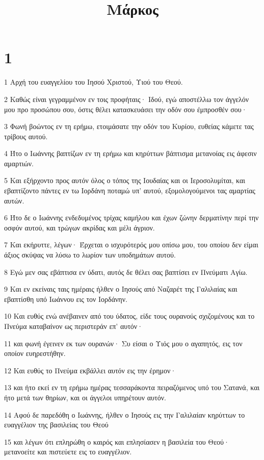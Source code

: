 

\title{Μάρκος}


\chapter{1}

\par 1 Αρχή του ευαγγελίου του Ιησού Χριστού, Υιού του Θεού.
\par 2 Καθώς είναι γεγραμμένον εν τοις προφήταις· Ιδού, εγώ αποστέλλω τον άγγελόν μου προ προσώπου σου, όστις θέλει κατασκευάσει την οδόν σου έμπροσθέν σου·
\par 3 Φωνή βοώντος εν τη ερήμω, ετοιμάσατε την οδόν του Κυρίου, ευθείας κάμετε τας τρίβους αυτού.
\par 4 Ήτο ο Ιωάννης βαπτίζων εν τη ερήμω και κηρύττων βάπτισμα μετανοίας εις άφεσιν αμαρτιών.
\par 5 Και εξήρχοντο προς αυτόν όλος ο τόπος της Ιουδαίας και οι Ιεροσολυμίται, και εβαπτίζοντο πάντες εν τω Ιορδάνη ποταμώ υπ' αυτού, εξομολογούμενοι τας αμαρτίας αυτών.
\par 6 Ήτο δε ο Ιωάννης ενδεδυμένος τρίχας καμήλου και έχων ζώνην δερματίνην περί την οσφύν αυτού, και τρώγων ακρίδας και μέλι άγριον.
\par 7 Και εκήρυττε, λέγων· Έρχεται ο ισχυρότερός μου οπίσω μου, του οποίου δεν είμαι άξιος σκύψας να λύσω το λωρίον των υποδημάτων αυτού.
\par 8 Εγώ μεν σας εβάπτισα εν ύδατι, αυτός δε θέλει σας βαπτίσει εν Πνεύματι Αγίω.
\par 9 Και εν εκείναις ταις ημέραις ήλθεν ο Ιησούς από Ναζαρέτ της Γαλιλαίας και εβαπτίσθη υπό Ιωάννου εις τον Ιορδάνην.
\par 10 Και ευθύς ενώ ανέβαινεν από του ύδατος, είδε τους ουρανούς σχιζομένους και το Πνεύμα καταβαίνον ως περιστεράν επ' αυτόν·
\par 11 και φωνή έγεινεν εκ των ουρανών· Συ είσαι ο Υιός μου ο αγαπητός, εις τον οποίον ευηρεστήθην.
\par 12 Και ευθύς το Πνεύμα εκβάλλει αυτόν εις την έρημον·
\par 13 και ήτο εκεί εν τη ερήμω ημέρας τεσσαράκοντα πειραζόμενος υπό του Σατανά, και ήτο μετά των θηρίων, και οι άγγελοι υπηρέτουν αυτόν.
\par 14 Αφού δε παρεδόθη ο Ιωάννης, ήλθεν ο Ιησούς εις την Γαλιλαίαν κηρύττων το ευαγγέλιον της βασιλείας του Θεού
\par 15 και λέγων ότι επληρώθη ο καιρός και επλησίασεν η βασιλεία του Θεού· μετανοείτε και πιστεύετε εις το ευαγγέλιον.
